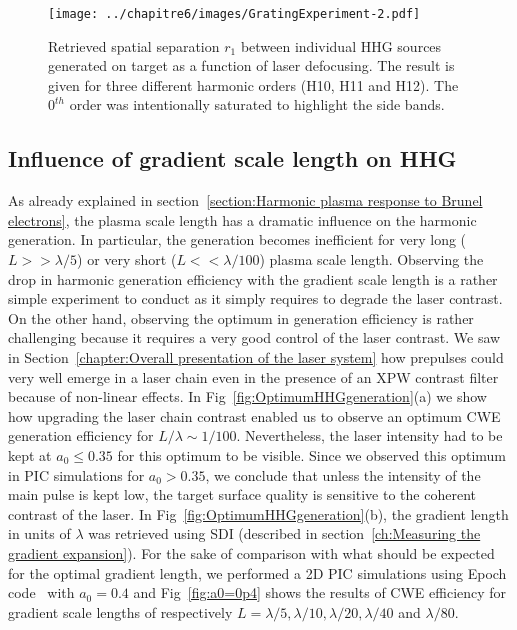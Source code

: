 \begin{figure}[H]
\centering
\texttt{[image: ../chapitre6/images/GratingExperiment-2.pdf]}\\
\caption{\label{fig:GratingExperiment-2} Retrieved spatial separation $r_1$ between individual HHG sources generated on target as a function of laser defocusing. The result is given for three different harmonic orders (H10, H11 and H12). The $0^{th}$ order was intentionally saturated to highlight the side bands.}
\end{figure}

\subsection{Influence of gradient scale length on HHG} \label{Influence of gradient scale length on harmonic generation}

As already explained in section~\ref{section:Harmonic plasma response to Brunel electrons}, the plasma scale length has a dramatic influence on the harmonic generation. In particular, the generation becomes inefficient for very long ($L >> \lambda/5$) or very short ($L<<\lambda/100$) plasma scale length. Observing the drop in harmonic generation efficiency with the gradient scale length is a rather simple experiment to conduct as it simply requires to degrade the laser contrast. On the other hand, observing the optimum in generation efficiency is rather challenging because it requires a very good control of the laser contrast. We saw in Section~\ref{chapter:Overall presentation of the laser system} how prepulses could very well emerge in a laser chain even in the presence of an XPW contrast filter because of non-linear effects. In Fig~\ref{fig:OptimumHHGgeneration}(a) we show how upgrading the laser chain contrast enabled us to observe an optimum CWE generation efficiency for $L/\lambda \sim 1/100$. 
Nevertheless, the laser intensity had to be kept at $a_0 \le 0.35$ for this optimum to be visible. Since we observed this optimum in PIC simulations for $a_0>0.35$, we conclude that unless the intensity of the main pulse is kept low, the target surface quality is sensitive to the coherent contrast of the laser.
In Fig~\ref{fig:OptimumHHGgeneration}(b), the gradient length in units of $\lambda$  was retrieved using SDI (described in section~\ref{ch:Measuring the gradient expansion}).
For the sake of comparison with what should be expected for the optimal gradient length, we performed a 2D PIC simulations using Epoch code~\cite{Arber:2015hc} with $a_0=0.4$ and Fig~\ref{fig:a0=0p4} shows the results of CWE efficiency for gradient scale lengths of respectively $L = \lambda/5, \lambda/10,\lambda/20,\lambda/40$ and $\lambda/80$.


